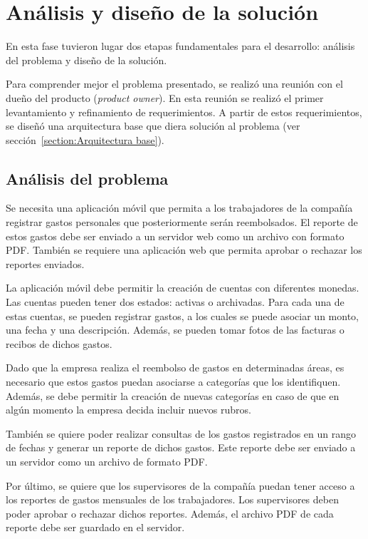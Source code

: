 \section{Análisis y diseño de la solución} \label{sect:Diseno}

En esta fase tuvieron lugar dos etapas fundamentales para el desarrollo: análisis del problema y diseño de la solución.

Para comprender mejor el problema presentado, se realizó una reunión con el dueño del producto (\textit{product owner}). En esta reunión se realizó el primer levantamiento y refinamiento de requerimientos. A partir de estos requerimientos, se diseñó una arquitectura base que diera solución al problema (ver sección~\ref{section:Arquitectura base}).

\subsection{Análisis del problema}

Se necesita una aplicación móvil que permita a los trabajadores de la compañía registrar gastos personales que posteriormente serán reembolsados. El reporte de estos gastos debe ser enviado a un servidor web como un archivo con formato PDF. También se requiere una aplicación web que permita aprobar o rechazar los reportes enviados.

La aplicación móvil debe permitir la creación de cuentas con diferentes monedas. Las cuentas pueden tener dos estados: activas o archivadas. Para cada una de estas cuentas, se pueden registrar gastos, a los cuales se puede asociar un monto, una fecha y una descripción. Además, se pueden tomar fotos de las facturas o recibos de dichos gastos.

Dado que la empresa realiza el reembolso de gastos en determinadas áreas, es necesario que estos gastos puedan asociarse a categorías que los identifiquen. Además, se debe permitir la creación de nuevas categorías en caso de que en algún momento la empresa decida incluir nuevos rubros.

También se quiere poder realizar consultas de los gastos registrados en un rango de fechas y generar un reporte de dichos gastos. Este reporte debe ser enviado a un servidor como un archivo de formato PDF.

Por último, se quiere que los supervisores de la compañía puedan tener acceso a los reportes de gastos mensuales de los trabajadores. Los supervisores deben poder aprobar o rechazar dichos reportes. Además, el archivo PDF de cada reporte debe ser guardado en el servidor.

